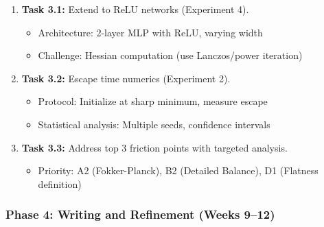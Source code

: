 \documentclass[
  journal=largetwo,
  year=2025,
  volume=37,
]{cup-journal}
\begin{document}
\begin{enumerate}
    \item[$\square$] \textbf{Task 3.1:} Extend to ReLU networks (Experiment 4).
    \begin{itemize}
        \item Architecture: 2-layer MLP with ReLU, varying width
        \item Challenge: Hessian computation (use Lanczos/power iteration)
    \end{itemize}
    
    \item[$\square$] \textbf{Task 3.2:} Escape time numerics (Experiment 2).
    \begin{itemize}
        \item Protocol: Initialize at sharp minimum, measure escape
        \item Statistical analysis: Multiple seeds, confidence intervals
    \end{itemize}
    
    \item[$\square$] \textbf{Task 3.3:} Address top 3 friction points with targeted analysis.
    \begin{itemize}
        \item Priority: A2 (Fokker-Planck), B2 (Detailed Balance), D1 (Flatness definition)
    \end{itemize}
\end{enumerate}

\subsubsection{Phase 4: Writing and Refinement (Weeks 9--12)}
\end{document}
